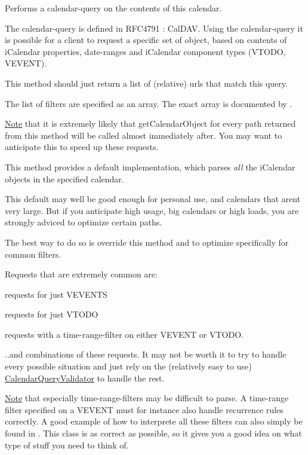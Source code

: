 Performs a calendar-\/query on the contents of this calendar.

The calendar-\/query is defined in R\+F\+C4791 \+: Cal\+D\+AV. Using the calendar-\/query it is possible for a client to request a specific set of object, based on contents of i\+Calendar properties, date-\/ranges and i\+Calendar component types (V\+T\+O\+DO, V\+E\+V\+E\+NT).

This method should just return a list of (relative) urls that match this query.

The list of filters are specified as an array. The exact array is documented by .

\mbox{\hyperlink{class_note}{Note}} that it is extremely likely that get\+Calendar\+Object for every path returned from this method will be called almost immediately after. You may want to anticipate this to speed up these requests.

This method provides a default implementation, which parses {\itshape all} the i\+Calendar objects in the specified calendar.

This default may well be good enough for personal use, and calendars that aren\textquotesingle{}t very large. But if you anticipate high usage, big calendars or high loads, you are strongly adviced to optimize certain paths.

The best way to do so is override this method and to optimize specifically for \textquotesingle{}common filters\textquotesingle{}.

Requests that are extremely common are\+:
\begin{DoxyItemize}
\item requests for just V\+E\+V\+E\+N\+TS
\item requests for just V\+T\+O\+DO
\item requests with a time-\/range-\/filter on either V\+E\+V\+E\+NT or V\+T\+O\+DO.
\end{DoxyItemize}

..and combinations of these requests. It may not be worth it to try to handle every possible situation and just rely on the (relatively easy to use) \mbox{\hyperlink{class_sabre_1_1_cal_d_a_v_1_1_calendar_query_validator}{Calendar\+Query\+Validator}} to handle the rest.

\mbox{\hyperlink{class_note}{Note}} that especially time-\/range-\/filters may be difficult to parse. A time-\/range filter specified on a V\+E\+V\+E\+NT must for instance also handle recurrence rules correctly. A good example of how to interprete all these filters can also simply be found in . This class is as correct as possible, so it gives you a good idea on what type of stuff you need to think of.


